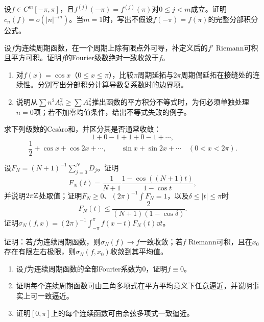 设$f\in C^m[-\pi,\pi]$，且$f^{(j)}(-\pi)=f^{(j)}(\pi)$对$0\le j<m$成立。证明$c_n(f)=o(|n|^{-m})$。当$m=1$时，写出不假设$f(-\pi)=f(\pi)$的完整分部积分公式。

设$f$为连续周期函数，在一个周期上除有限点外可导，补定义后的$f'$ Riemann可积且平方可积。证明$f$的Fourier级数绝对一致收敛于$f$。

\begin{enumerate}[label=(\arabic*)]
\item 对$f(x)=\cos x$（$0\le x\le\pi$），比较$\pi$周期延拓与$2\pi$周期偶延拓在接缝处的连续性。分别写出分部积分计算导数复系数时的边界项。
\item 说明从$\sum n^2A_n^2\ge\sum A_n^2$推出函数的平方积分不等式时，为何必须单独处理$n=0$项；若不加零均值条件，给出不等式失败的例子。
\end{enumerate}

求下列级数的Ces\`aro和，并区分其是否通常收敛：
\[
 1+0-1+1+0-1+\cdots,
\]
\[
 \frac12+\cos x+\cos2x+\cdots,\qquad
 \sin x+\sin2x+\cdots\quad(0<x<2\pi).
\]

设$F_N=(N+1)^{-1}\sum_{j=0}^ND_j$。证明
\[
 F_N(t)=\frac1{N+1}\frac{1-\cos((N+1)t)}{1-\cos t},
\]
并说明$2\pi\mathbb Z$处取值；证明$F_N\ge0$、$(2\pi)^{-1}\int F_N=1$，以及$\delta\le|t|\le\pi$时
\[
 F_N(t)\le\frac{2}{(N+1)(1-\cos\delta)}.
\]
证明$\sigma_N(f,x)=(2\pi)^{-1}\int_{-\pi}^{\pi}f(x-t)F_N(t)\dd t$。

证明：若$f$为连续周期函数，则$\sigma_N(f)\to f$一致收敛；若$f$ Riemann可积，且在$x_0$存在有限左右极限，则$\sigma_N(f,x_0)$收敛到其平均值。

\begin{enumerate}[label=(\arabic*)]
\item 设$f$为连续周期函数的全部Fourier系数为$0$，证明$f\equiv0$。
\item 证明每个连续周期函数可由三角多项式在平方平均意义下任意逼近，并说明事实上可一致逼近。
\item 证明$[0,\pi]$上的每个连续函数可由余弦多项式一致逼近。
\end{enumerate}

